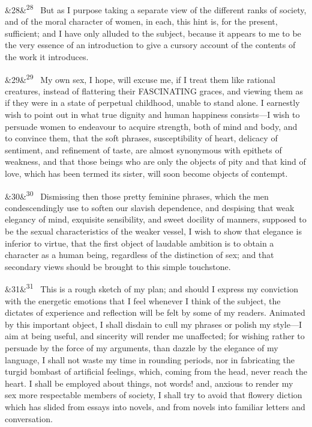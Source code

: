 \documentclass[12pt]{article}
\newcommand{\para}[1][]{\par\noindent\ifx&#1&\else\textsuperscript{\footnotesize #1}~\fi}
\begin{document}
\para[28] But as I purpose taking a separate view of the different ranks of society, and of the moral character of women, in each, this hint is, for the present, sufficient; and I have only alluded to the subject, because it appears to me to be the very essence of an introduction to give a cursory account of the contents of the work it introduces.

\para[29] My own sex, I hope, will excuse me, if I treat them like rational creatures, instead of flattering their FASCINATING graces, and viewing them as if they were in a state of perpetual childhood, unable to stand alone. I earnestly wish to point out in what true dignity and human happiness consists---I wish to persuade women to endeavour to acquire strength, both of mind and body, and to convince them, that the soft phrases, susceptibility of heart, delicacy of sentiment, and refinement of taste, are almost synonymous with epithets of weakness, and that those beings who are only the objects of pity and that kind of love, which has been termed its sister, will soon become objects of contempt.

\para[30] Dismissing then those pretty feminine phrases, which the men condescendingly use to soften our slavish dependence, and despising that weak elegancy of mind, exquisite sensibility, and sweet docility of manners, supposed to be the sexual characteristics of the weaker vessel, I wish to show that elegance is inferior to virtue, that the first object of laudable ambition is to obtain a character as a human being, regardless of the distinction of sex; and that secondary views should be brought to this simple touchstone.

\para[31] This is a rough sketch of my plan; and should I express my conviction with the energetic emotions that I feel whenever I think of the subject, the dictates of experience and reflection will be felt by some of my readers. Animated by this important object, I shall disdain to cull my phrases or polish my style---I aim at being useful, and sincerity will render me unaffected; for wishing rather to persuade by the force of my arguments, than dazzle by the elegance of my language, I shall not waste my time in rounding periods, nor in fabricating the turgid bombast of artificial feelings, which, coming from the head, never reach the heart. I shall be employed about things, not words! and, anxious to render my sex more respectable members of society, I shall try to avoid that flowery diction which has slided from essays into novels, and from novels into familiar letters and conversation.
\end{document}
